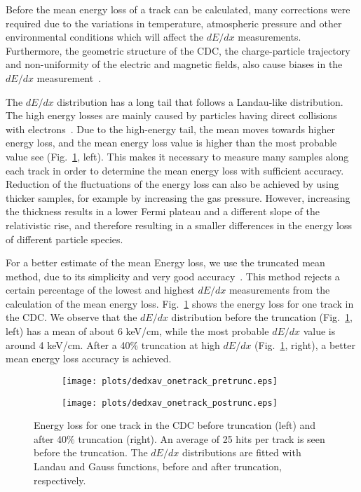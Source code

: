 Before the mean energy loss of a track can be calculated, many corrections were required due to the variations in temperature, atmospheric pressure and other environmental conditions which will affect the $dE/dx$ measurements. Furthermore, the geometric structure of the CDC, the charge-particle trajectory and non-uniformity of the electric and magnetic fields, also cause biases in the $dE/dx$ measurement~\cite{37,38,39}.
~\par The $dE/dx$ distribution has a long tail that follows a Landau-like distribution. The high energy losses are mainly caused by particles having direct collisions with electrons~\cite{36}. Due to the high-energy tail, the mean moves towards higher energy loss, and the mean energy loss value is higher than the most probable value see (Fig.~\ref{fig.3.3}, left). This makes it necessary to measure many samples along each track in order to determine the mean energy loss with sufficient accuracy. Reduction of the fluctuations of the energy loss can also be achieved by using thicker samples, for example by increasing the gas pressure. However, increasing the thickness results in a lower Fermi plateau and a different slope of the relativistic rise, and therefore resulting in a smaller differences in the energy loss of different particle species.
~\par For a better estimate of the mean Energy loss, we use the truncated mean method, due to its simplicity and very good accuracy~\cite{37,38,39}. This method rejects a certain percentage of the lowest and highest $dE/dx$ measurements from the calculation of the mean energy loss. Fig.~\ref{fig.3.3} shows the energy loss for one track in the CDC. We observe that the $dE/dx$ distribution before the truncation (Fig.~\ref{fig.3.3}, left) has a mean of about 6 keV/cm, while the most probable $dE/dx$ value is around 4 keV/cm. After a 40$\%$ truncation at high $dE/dx$ (Fig.~\ref{fig.3.3}, right), a better mean energy loss accuracy is achieved.

\begin{figure}[H]
    \centering
    \begin{subfigure}[b]{0.5\textwidth}
        \texttt{[image: plots/dedxav\_onetrack\_pretrunc.eps]}
    \end{subfigure}\hfill
    \begin{subfigure}[b]{0.5\textwidth}
        \texttt{[image: plots/dedxav\_onetrack\_postrunc.eps]}
    \end{subfigure}
    \caption{Energy loss for one track in the CDC before truncation (left) and after 40$\%$ truncation (right). An average of 25 hits per track is seen before the truncation. The $dE/dx$ distributions are fitted with Landau and Gauss functions, before and after truncation, respectively.}
    \label{fig.3.3}
\end{figure}
\vfill

